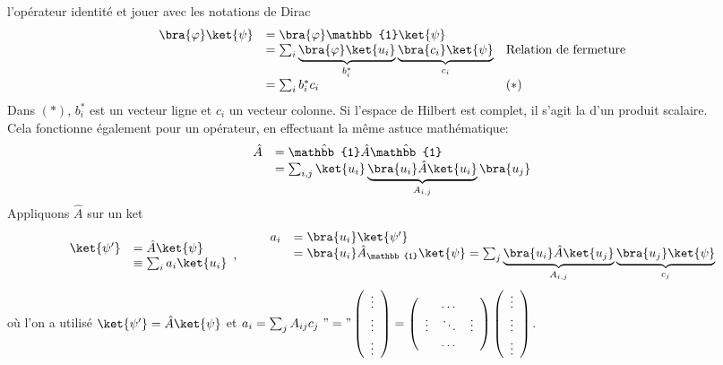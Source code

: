 l'opérateur identité et jouer avec les notations de Dirac
\begin{equation}
\begin{array}{lll}
\bra{\varphi}\ket{\psi} &= \bra{\varphi}\mathbb{1}\ket{\psi}\\
&= \sum_i \underbrace{\bra{\varphi}\ket{u_i}}_{b_i^*}\underbrace{\bra{c_i}\ket{\psi}}_{c_i} &
\text{Relation de fermeture}\\
&= \sum_i b_i^*c_i & (*)
\end{array}
\end{equation}
Dans $(*)$, $b_i^*$ est un vecteur ligne et $c_i$ un vecteur colonne. Si l'espace de Hilbert 
est complet, il s'agit la d'un produit scalaire.\\
Cela fonctionne également pour un opérateur, en effectuant la même astuce mathématique:
\begin{equation}
\begin{array}{ll}
\hat{A} &= \hat{\mathbb{1}}\hat{A}\hat{\mathbb{1}}\\
&=\sum_{i,j} \ket{u_i}\underbrace{\bra{u_i}\hat{A}\ket{u_i}}_{A_{i,j}}\bra{u_j}
\end{array}
\end{equation}
Appliquons $\hat{A}$ sur un ket
\begin{equation}
\begin{array}{ll}
\ket{\psi'} &= \hat{A}\ket{\psi}\\
&\equiv \sum_i a_i\ket{u_i}
\end{array},\qquad \begin{array}{ll}
a_i &= \bra{u_i}\ket{\psi'}\\
&=\bra{u_i}\hat{A}_\mathbb{1}\ket{\psi} = \sum_j \underbrace{\bra{u_i}\hat{A}\ket{u_j}}_{A_{i,j}}
\underbrace{\bra{u_j}\ket{\psi}}_{c_j}
\end{array}
\end{equation}
où l'on a utilisé $\ket{\psi'} = \hat{A}\ket{\psi}$ et $a_i = \sum_jA_{ij}c_j\  "=" 
\left(\begin{array}{c}
\vdots\\
\vdots\\
\vdots
\end{array}\right) = \left(\begin{array}{ccc}
  & \dots &  \\
\vdots &\ddots &\vdots\\
  & \dots &  
\end{array}\right)\left(\begin{array}{c}
\vdots\\
\vdots\\
\vdots\\
\end{array}\right)$.



